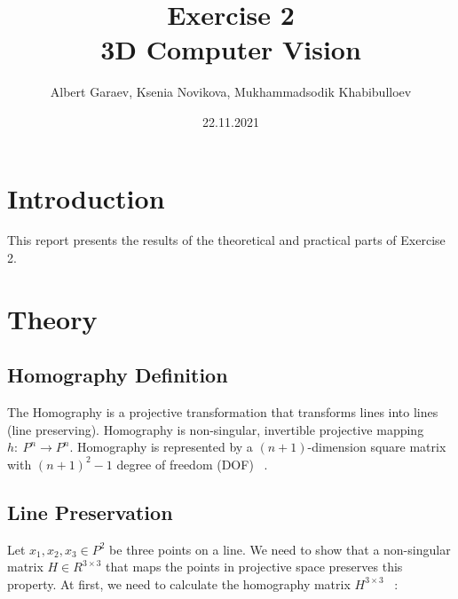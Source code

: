 \documentclass[a4paper, twoside, english]{article}
\title{Exercise 2 \\ 3D Computer Vision}  %
\author{Albert Garaev, Ksenia Novikova, Mukhammadsodik Khabibulloev }    %
\date{22.11.2021}                              %
\begin{document}
\maketitle

\section{Introduction}

This report presents the results of the theoretical and practical parts of Exercise 2.

\section{Theory}
\subsection{ Homography Definition}
The Homography is a projective transformation that transforms lines into lines (line preserving).  Homography is non-singular, invertible projective mapping $h:\ P^n \rightarrow P^n.$ 
Homography is represented by a $(n + 1)$-dimension square matrix with $(n + 1)^2 - 1$ degree of freedom (DOF) ~\cite{Stricker2021}.
\subsection{ Line Preservation}
Let $ x_1, x_2, x_3 \in P^2$ be three points on a line. We need to show that a non-singular matrix $H\in R^{3 \times 3}$ that
maps the points in projective space preserves this property.
At first, we need to calculate the homography matrix $H^{3 \times 3}$ ~\cite{Stricker2021}:
\end{document}
